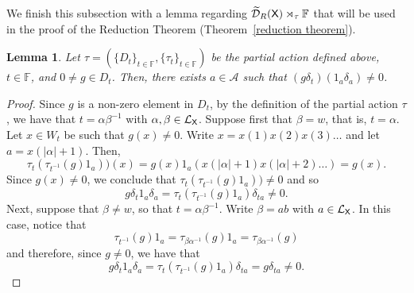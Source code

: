 \documentclass[a4paper,12pt]{amsart}
\newtheorem{lemma}[equation]{Lemma}
\theoremstyle{definition}
\theoremstyle{remark}
\numberwithin{equation}{section}
\newcommand{\osf}{{\normalfont \textsf{X}}}
\newcommand{\lang}{\CL_{\osf}}
\newcommand{\udalgshift}{\TCD_R(\osf)}
\newcommand{\alf}{\mathscr{A}}
\newcommand{\F}{\mathbb{F}}
\newcommand{\CD}{\mathcal{D}}
\newcommand{\CL}{\mathcal{L}}
\newcommand{\TCD}{\widetilde{\CD}}
\begin{document}
We finish this subsection with a lemma regarding $ \udalgshift\rtimes_{\tau}\F$ that will be used in the proof of the Reduction Theorem (Theorem~\ref{reduction theorem}).


\begin{lemma}\label{claim1}
    Let $\tau=\left( \{D_t\}_{t\in \F}, \{\tau_t\}_{t\in\F} \right)$ be the partial action defined above, $t\in \F$, and $0\neq g\in D_t$. Then, there exists $a\in \alf$ such that $(g\delta_t)( 1_a\delta_a)\neq 0$.
\end{lemma}
\begin{proof}
Since $g$ is a non-zero element in $D_t$, by the definition of the partial action $\tau$, we have that $t=\alpha\beta^{-1}$ with $\alpha, \beta \in \lang$. 
Suppose first that $\beta =w$, that is, $t=\alpha$. Let $x\in W_t$ be such that $g(x)\neq 0$. Write $x=x(1)x(2)x(3)\ldots$ and let $a=x({|\alpha|+1})$. Then, 
$$\tau_t(\tau_{t^{-1}}(g)1_a))(x)=g(x)1_a\left(x(|\alpha|+1)x(|\alpha|+2)\ldots\right)=g(x).$$ Since $g(x)\neq 0$, we conclude that  
$\tau_t(\tau_{t^{-1}}(g)1_a))\neq 0$ and so 
$$g\delta_t 1_a\delta_a=\tau_t(\tau_{t^{-1}}(g)1_a)\delta_{ta}\neq 0.$$
Next, suppose that $\beta \neq w$, so that $t=\alpha\beta^{-1}$. Write $\beta=ab$ with $a\in \lang$. In this case, notice that 
$$\tau_{t^{-1}}(g)1_a=\tau_{\beta \alpha^{-1}}(g)1_a=\tau_{\beta \alpha^{-1}}(g)$$ and therefore, since $g\neq 0$, we have that
$$g\delta_t 1_a\delta_a=\tau_t(\tau_{t^{-1}}(g)1_a)\delta_{ta}=g\delta_{ta}\neq 0.$$ 
\end{proof}



\end{document}

